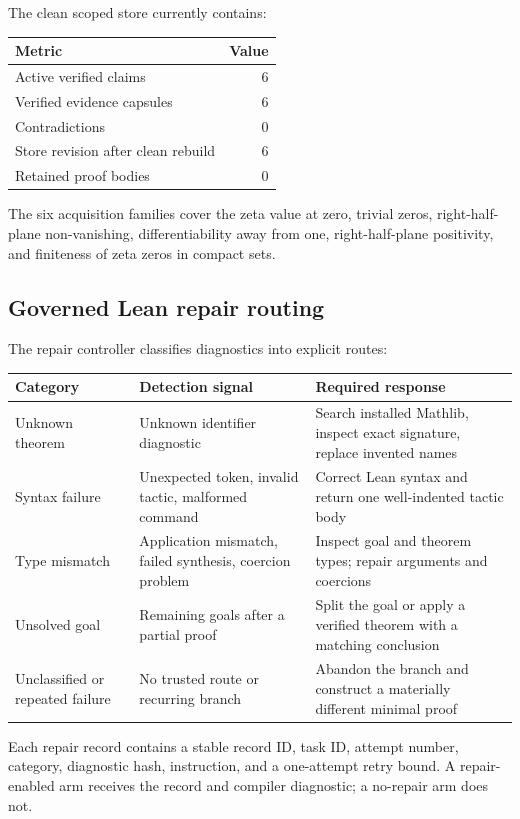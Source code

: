 \documentclass[11pt,a4paper]{article}
\begin{document}
The clean scoped store currently contains:

\begin{center}
\begin{tabular}{lr}
\toprule
Metric & Value \\
\midrule
Active verified claims & 6 \\
Verified evidence capsules & 6 \\
Contradictions & 0 \\
Store revision after clean rebuild & 6 \\
Retained proof bodies & 0 \\
\bottomrule
\end{tabular}
\end{center}

The six acquisition families cover the zeta value at zero, trivial zeros,
right-half-plane non-vanishing, differentiability away from one,
right-half-plane positivity, and finiteness of zeta zeros in compact sets.

\subsection{Governed Lean repair routing}

The repair controller classifies diagnostics into explicit routes:

\begin{longtable}{p{35mm}p{50mm}p{66mm}}
\toprule
Category & Detection signal & Required response \\
\midrule
\endhead
Unknown theorem & Unknown identifier diagnostic & Search installed Mathlib, inspect exact signature, replace invented names \\
Syntax failure & Unexpected token, invalid tactic, malformed command & Correct Lean syntax and return one well-indented tactic body \\
Type mismatch & Application mismatch, failed synthesis, coercion problem & Inspect goal and theorem types; repair arguments and coercions \\
Unsolved goal & Remaining goals after a partial proof & Split the goal or apply a verified theorem with a matching conclusion \\
Unclassified or repeated failure & No trusted route or recurring branch & Abandon the branch and construct a materially different minimal proof \\
\bottomrule
\end{longtable}

Each repair record contains a stable record ID, task ID, attempt number,
category, diagnostic hash, instruction, and a one-attempt retry bound. A
repair-enabled arm receives the record and compiler diagnostic; a no-repair arm
does not.
\end{document}
